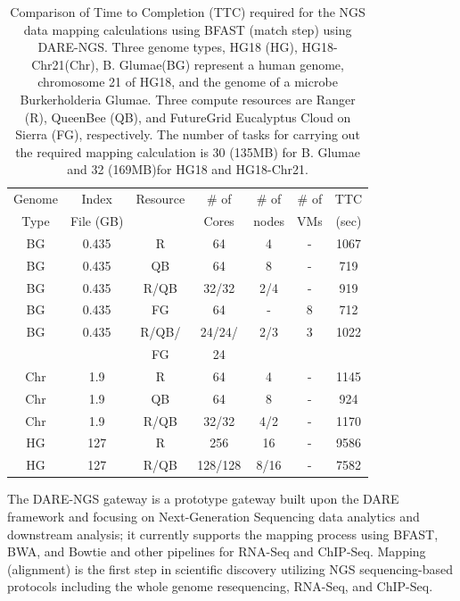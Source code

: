 \documentclass[]{svjour3}
\begin{document}
\begin{table}
\centering
\scriptsize
 \begin{tabular}{|c|c|c|c|c|c|c|} 
 \hline 
Genome & Index         & Resource    & \# of & \# of &   \# of         &	TTC  \\
  Type               & File (GB)        & &Cores &   nodes &  VMs&  (sec)\\  
  \hline
 BG &0.435& R&	64 &4&-	&1067 \\
\hline                  
BG &0.435& QB	&	64& 8&-	&719 \\
\hline
 BG &0.435&R/QB	&	32/32 &2/4& -&919 \\
\hline
 BG &0.435& FG &	64 &-&8	&712 \\
\hline
 BG &0.435 &  R/QB/ &	24/24/& 2/3 & 3 &1022\\
 & & FG& 24 &&&\\
\hline
\hline
Chr &1.9& R	&	64& 4 &-&1145 \\
\hline
Chr &1.9& QB	&	64&8&-	&924 \\
\hline
Chr &1.9& R/QB	&	32/32& 4/2&	-&1170 \\
\hline
\hline
HG &127& R	&	256 & 16 &-	&9586\\
\hline
HG &127& R/QB	&	128/128&8/16 & -&7582 \\
\hline
\end{tabular}
\caption{
  Comparison of Time to Completion (TTC) required for the NGS data
  mapping calculations using BFAST (match step) using DARE-NGS. 
  Three genome types,
  HG18 (HG), HG18-Chr21(Chr), B. Glumae(BG) represent a human genome,
  chromosome 21 of HG18, and the genome of a microbe Burkerholderia
  Glumae. Three compute resources are Ranger (R), QueenBee (QB), and
  FutureGrid  Eucalyptus Cloud on Sierra (FG), respectively. The
  number of tasks for carrying out the required mapping calculation is
  30 (135MB) for B. Glumae and 32 (169MB)for HG18 and HG18-Chr21.
}

  \label{table:NGS-Distributed} 
\end{table}

The DARE-NGS gateway %
is a prototype gateway built upon the DARE framework and focusing on
Next-Generation Sequencing data analytics and downstream analysis; it
currently supports the mapping process using BFAST, BWA, and Bowtie
and other pipelines for RNA-Seq and
ChIP-Seq\cite{mardis2008-arghg,ecmls_ccpe10}. Mapping (alignment) is
the first step in scientific discovery utilizing NGS sequencing-based
protocols including the whole genome resequencing, RNA-Seq, and
ChIP-Seq.
\end{document}

